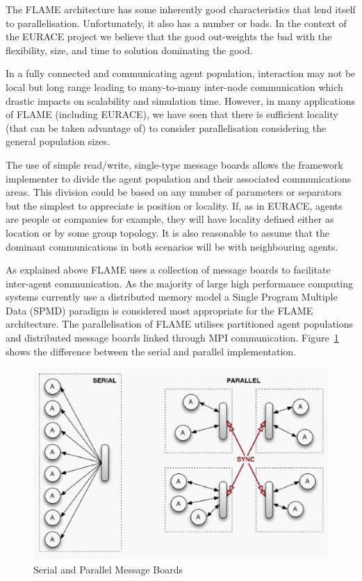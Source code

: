 The FLAME architecture has some inherently good characteristics that lend itself to parallelisation. Unfortunately, it also has a number or bads. In the context of the EURACE project we believe that the good out-weights the bad with the flexibility, size, and time to solution dominating the good. 

In a fully connected and communicating agent population, interaction may not be local but long range leading to many-to-many inter-node communication which drastic impacts on scalability and simulation time. However, in many applications of FLAME (including EURACE), we have seen that there is sufficient locality (that can be taken advantage of) to consider parallelisation considering the general population sizes. 

The use of simple read/write, single-type message boards allows the framework implementer to divide the agent population and their associated communications areas. This division could be based on any number of parameters or separators but the simplest to appreciate is position or locality. If, as in EURACE, agents are people or companies for example, they will have locality defined either as location or by some group topology. It is also reasonable to assume that the dominant communications in both scenarios will be with neighbouring agents.

As explained above FLAME uses a collection of message boards to facilitate inter-agent communication. As the majority of large high performance computing systems currently use a distributed memory model a Single Program Multiple Data (SPMD) paradigm is considered most appropriate for the FLAME architecture. The parallelisation of FLAME utilises partitioned agent populations and distributed message boards linked through MPI communication. Figure~\ref{fig:Figure2} shows the difference between the serial and parallel implementation.

\begin{figure}[h]
	\centering
		\includegraphics[scale=0.25]{flame.jpg}
	\caption{Serial and Parallel Message Boards}
	\label{fig:Figure2}
\end{figure}

